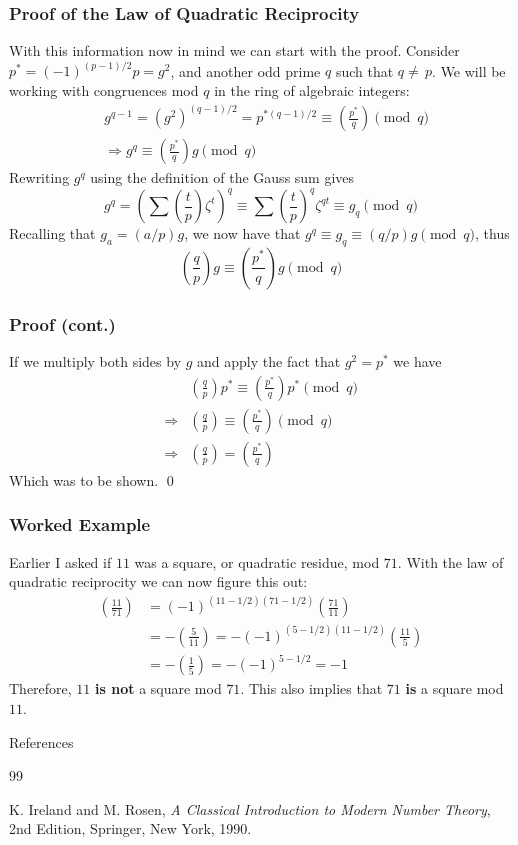 \documentclass{beamer}
\begin{document}
\begin{frame}
    \frametitle{Proof of the Law of Quadratic Reciprocity}
    With this information now in mind we can start with the proof. Consider $p^{*} = \left(-1\right)^{(p-1)/2}p=g^2$, and another odd prime $q$ such that $q\neq\,p$. We will be working with congruences mod $q$ in the ring of algebraic integers: 
    \begin{align*}
        &g^{q-1} = \left(g^2\right)^{(q-1)/2} = p^{*\left(q-1\right)/2} \equiv \left(\frac{p^*}{q}\right) \pmod{q} \\
        &\Rightarrow g^{q} \equiv \left(\frac{p^*}{q}\right)g \pmod{q}
    \end{align*}
    Rewriting $g^q$ using the definition of the Gauss sum gives 
    \[
        g^{q} = \left(\sum\left(\frac{t}{p}\right)\zeta^{t}\right)^{q} \equiv \sum\left(\frac{t}{p}\right)^{q}\zeta^{qt} \equiv g_q \pmod{q}
    \]
    Recalling that $g_a = (a/p)g$, we now have that $g^{q} \equiv g_{q} \equiv (q/p)g \pmod{q}$, thus 
    \[
        \left(\frac{q}{p}\right)g \equiv \left(\frac{p^*}{q}\right)g \pmod{q}
    \]
\end{frame}

\begin{frame}
    \frametitle{Proof (cont.)}
    If we multiply both sides by $g$ and apply the fact that $g^2 = p^*$ we have 
    \begin{align*}
        &\left(\frac{q}{p}\right)p^* \equiv \left(\frac{p^{*}}{q}\right)p^* \pmod{q} \\
        \Rightarrow& \left(\frac{q}{p}\right) \equiv \left(\frac{p^*}{q}\right) \pmod{q} \\
        \Rightarrow& \left(\frac{q}{p}\right) = \left(\frac{p^*}{q}\right) 
    \end{align*}
    Which was to be shown. \qed
\end{frame}

\begin{frame}
    \frametitle{Worked Example}
    Earlier I asked if $11$ was a square, or quadratic residue, mod $71$. With the law of quadratic reciprocity we can now figure this out: 
    \begin{align*}
        \left(\frac{11}{71}\right) &= \left(-1\right)^{(11-1/2)(71-1/2)}\left(\frac{71}{11}\right) \\
        &= -\left(\frac{5}{11}\right) = -\left(-1\right)^{(5-1/2)(11-1/2)}\left(\frac{11}{5}\right) \\
        &= -\left(\frac{1}{5}\right) = -\left(-1\right)^{5-1/2} = -1
    \end{align*}
    Therefore, $11$ \textbf{is not} a square mod $71$. This also implies that $71$ \textbf{is} a square mod $11$.
\end{frame}

\begin{frame}{References}
    \begin{thebibliography}{99}

    K. Ireland and M. Rosen, 
    \textit{A Classical Introduction to Modern Number Theory}, 
    2nd Edition, Springer, New York, 1990.

    \end{thebibliography}
\end{frame}
\end{document}

